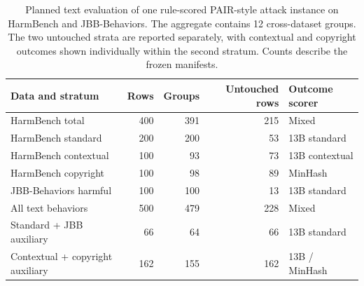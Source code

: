 \begin{table}[t]
\centering
\small
\begin{tabular}{lrrrl}
\toprule
Data and stratum & Rows & Groups & Untouched rows & Outcome scorer \\
\midrule
HarmBench total & 400 & 391 & 215 & Mixed \\
HarmBench standard & 200 & 200 & 53 & 13B standard \\
HarmBench contextual & 100 & 93 & 73 & 13B contextual \\
HarmBench copyright & 100 & 98 & 89 & MinHash \\
JBB-Behaviors harmful & 100 & 100 & 13 & 13B standard \\
All text behaviors & 500 & 479 & 228 & Mixed \\
Standard + JBB auxiliary & 66 & 64 & 66 & 13B standard \\
Contextual + copyright auxiliary & 162 & 155 & 162 & 13B / MinHash \\
\bottomrule
\end{tabular}
\caption{Planned text evaluation of one rule-scored PAIR-style attack instance on HarmBench and JBB-Behaviors. The aggregate contains 12 cross-dataset groups. The two untouched strata are reported separately, with contextual and copyright outcomes shown individually within the second stratum. Counts describe the frozen manifests.}
\label{tab:dataset_scope}
\end{table}
